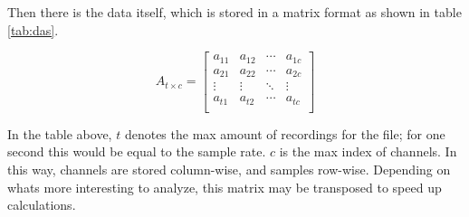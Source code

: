 Then there is the data itself, which is stored in a matrix format as shown in table \ref{tab:das}.

\[
  A_{t\times c} =
  \left[ {\begin{array}{cccc}
    a_{11} & a_{12} & \cdots & a_{1c}\\
    a_{21} & a_{22} & \cdots & a_{2c}\\
    \vdots & \vdots & \ddots & \vdots\\
    a_{t1} & a_{t2} & \cdots & a_{tc}\\
    \label{tab:das}
  \end{array} } \right]
\]

In the table above, $t$ denotes the max amount of recordings for the file; for one second this would be equal to the sample rate. $c$ is the max index of channels. In this way, channels are stored column-wise, and samples row-wise. Depending on whats more interesting to analyze, this matrix may be transposed to speed up calculations.